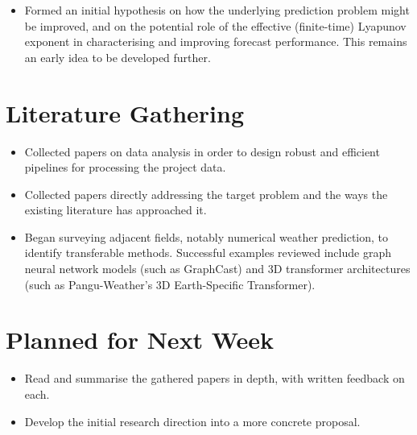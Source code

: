 \documentclass[11pt,a4paper]{article}
\begin{document}
\begin{itemize}
  \item Formed an initial hypothesis on how the underlying prediction problem
        might be improved, and on the potential role of the effective
        (finite-time) Lyapunov exponent in characterising and improving
        forecast performance. This remains an early idea to be developed
        further.
\end{itemize}

\section{Literature Gathering}

\begin{itemize}
  \item Collected papers on data analysis in order to design robust and
        efficient pipelines for processing the project data.
  \item Collected papers directly addressing the target problem and the ways
        the existing literature has approached it.
  \item Began surveying adjacent fields, notably numerical weather prediction,
        to identify transferable methods. Successful examples reviewed include
        graph neural network models (such as GraphCast) and 3D transformer
        architectures (such as Pangu-Weather's 3D Earth-Specific Transformer).
\end{itemize}

\section{Planned for Next Week}

\begin{itemize}
  \item Read and summarise the gathered papers in depth, with written feedback
        on each.
  \item Develop the initial research direction into a more concrete proposal.
\end{itemize}
\end{document}
